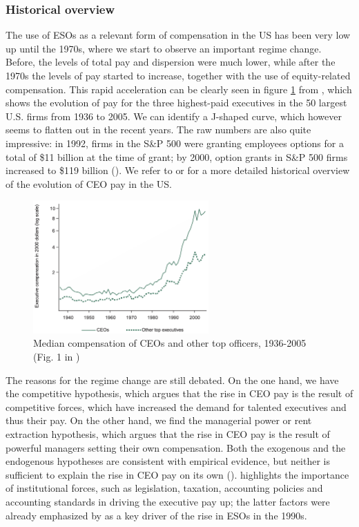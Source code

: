 \subsubsection{Historical overview}
The use of ESOs as a relevant form of compensation in the US has been very low up until the 1970s, where we start to observe an important regime change. Before, the levels of total pay and dispersion were much lower, while after the 1970s the levels of pay started to increase, together with the use of equity-related compensation.
This rapid acceleration can be clearly seen in figure \ref*{fig:frydman_fig1} from \cite{frydman2010ceo}, which shows the evolution of pay for the three highest-paid executives in the 50 largest U.S. firms from 1936 to 2005. We can identify a J-shaped curve, which however seems to flatten out in the recent years. The raw numbers are also quite impressive: in 1992, firms in the S\&P 500 were granting employees options for a total of \$11 billion at the time of grant; by 2000, option grants in S\&P 500 firms increased to \$119 billion (\cite{hall2003trouble}). We refer to \cite{frydman2010ceo} or \cite{edmans2017executive} for a more detailed historical overview of the evolution of CEO pay in the US. 

\vspace*{15pt}
\begin{figure}[H]
    \centering
    \includegraphics[width=0.6\textwidth]{fig/2/Frydman_fig1.png}
    \caption{Median compensation of CEOs and other top officers, 1936-2005 (Fig. 1 in \cite{frydman2010ceo})}
    \label{fig:frydman_fig1}
\end{figure}
\vspace*{15pt}


The reasons for the regime change are still debated. On the one hand, we have the competitive hypothesis, which argues that the rise in CEO pay is the result of competitive forces, which have increased the demand for talented executives and thus their pay. On the other hand, we find the managerial power or rent extraction hypothesis, which argues that the rise in CEO pay is the result of powerful managers setting their own compensation. Both the exogenous and the endogenous hypotheses are consistent with empirical evidence, but neither is sufficient to explain the rise in CEO pay on its own (\cite{frydman2010ceo}). \cite{edmans2017executive} highlights the importance of institutional forces, such as legislation, taxation, accounting policies and accounting standards in driving the executive pay up; the latter factors were already emphasized by \cite{hall2003trouble} as a key driver of the rise in ESOs in the 1990s. 


